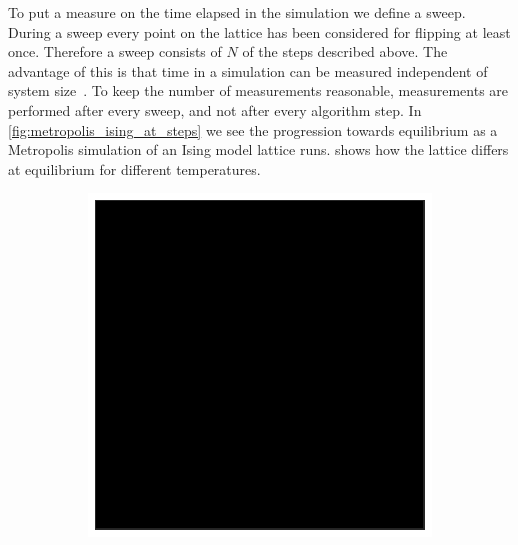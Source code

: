 \documentclass[11pt, a4paper]{report} %
\begin{document}
To put a measure on the time elapsed in the simulation we define a sweep.
During a sweep every point on the lattice has been considered for flipping at least once.
Therefore a sweep consists of \(N\) of the steps described above.
The advantage of this is that time in a simulation can be measured independent of system size~\cite{newman:1999}.
To keep the number of measurements reasonable, measurements are performed after every sweep, and not after every algorithm step.
In \cref{fig:metropolis_ising_at_steps} we see the progression towards equilibrium as a Metropolis simulation of an Ising model lattice runs.
 shows how the lattice differs at equilibrium for different temperatures.

\begin{figure}[htb]
	\centering
	\begin{subfigure}[c]{0.2\linewidth}
		\includegraphics[width=\linewidth]{20160603124433_40_by_40_Lattice_step0.pdf}
	\end{subfigure}
	~
	\begin{subfigure}[c]{0.2\linewidth}

\end{subfigure}
\end{figure}
\end{document}
